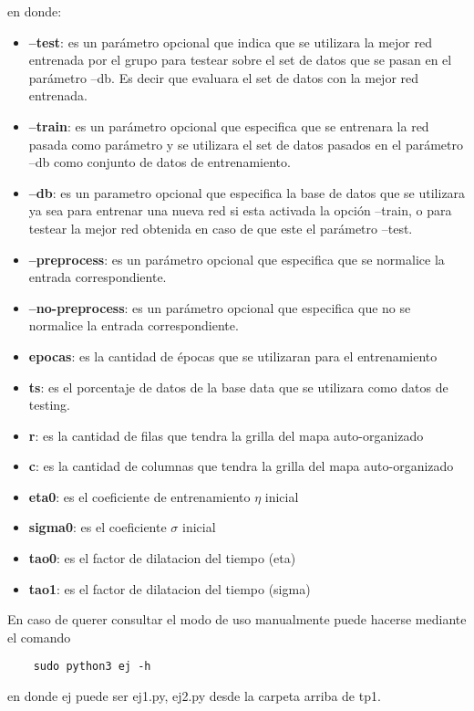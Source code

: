 en donde:
\begin{itemize}
  \item \textbf{--test}: es un parámetro opcional que indica que se utilizara la mejor red entrenada por el grupo para testear sobre el set de datos que se pasan en el parámetro
  --db. Es decir que evaluara el set de datos con la mejor red entrenada.
  \item \textbf{--train}: es un parámetro opcional que especifica que se entrenara la red pasada como parámetro y se utilizara el set de datos pasados en el parámetro --db
  como conjunto de datos de entrenamiento.
  \item \textbf{--db}: es un parametro opcional que especifica la base de datos que se utilizara ya sea para entrenar una nueva red si esta activada la opción --train, o
  para testear la mejor red obtenida en caso de que este el parámetro --test.
  \item \textbf{--preprocess}: es un parámetro opcional que especifica que se normalice la entrada correspondiente.
  \item \textbf{--no-preprocess}: es un parámetro opcional que especifica que no se normalice la entrada correspondiente.
  \item \textbf{epocas}: es la cantidad de épocas que se utilizaran para el entrenamiento
  \item \textbf{ts}: es el porcentaje de datos de la base data que se utilizara como datos de testing.
  \item \textbf{r}: es la cantidad de filas que tendra la grilla del mapa auto-organizado
  \item \textbf{c}: es la cantidad de columnas que tendra la grilla del mapa auto-organizado
  \item \textbf{eta0}: es el coeficiente de entrenamiento $\eta$ inicial
  \item \textbf{sigma0}: es el coeficiente $\sigma$ inicial
  \item \textbf{tao0}: es el factor de dilatacion del tiempo (eta)
  \item \textbf{tao1}: es el factor de dilatacion del tiempo (sigma)


\end{itemize}

En caso de querer consultar el modo de uso manualmente puede hacerse mediante el comando
\begin{verbatim}
    sudo python3 ej -h
\end{verbatim}
en donde ej puede ser {ej1.py, ej2.py} desde la carpeta arriba de tp1.

\newpage
